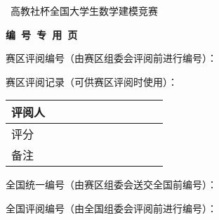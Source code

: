 \renewcommand{\baselinestretch}{1.3}\normalsize
\newpage
\thispagestyle{empty} %
{\fontsize{14pt}{\baselineskip}\selectfont \bfseries
\begin{center}{\Large\the\year}~高教社杯全国大学生数学建模竞赛\par\vspace{.5\baselineskip}\par
{\fontsize{15.75pt}{\baselineskip}\selectfont\bf 编\ 号\ 专\ 用\ 页}
\end{center}\par\vspace{1em}\par}
{%
\par\vfill
赛区评阅编号（由赛区组委会评阅前进行编号）：\par\vfill\vfill

赛区评阅记录（可供赛区评阅时使用）：\\
\begin{tabular}{|l|l|l|l|l|l|l|l|l|l|l|}
\hline
\multicolumn{1}{|c|}{\parbox[t]{0.5cm}{\vspace{1ex}评阅人\vspace{1ex}}\hfill}
&\multicolumn{1}{|c|}{\hspace{30pt}\hfill}
&\multicolumn{1}{|c|}{\hspace{30pt}\hfill}
&\multicolumn{1}{|c|}{\hspace{30pt}\hfill}
&\multicolumn{1}{|c|}{\hspace{30pt}\hfill}
&\multicolumn{1}{|c|}{\hspace{30pt}\hfill}
&\multicolumn{1}{|c|}{\hspace{30pt}\hfill}
&\multicolumn{1}{|c|}{\hspace{30pt}\hfill}
&\multicolumn{1}{|c|}{\hspace{30pt}\hfill}
&\multicolumn{1}{|c|}{\hspace{30pt}\hfill}
&\multicolumn{1}{|c|}{\hspace{30pt}\hfill}\\
\hline
\parbox[t]{0.5cm}{\vspace{1ex}评分\vspace{2ex}}& & & &
& & & & & &
\\\hline
\parbox[t]{0.5cm}{\vspace{1ex}备注\vspace{2ex}}& & & & & & & & & & \\\hline
\end{tabular}
\par\vfill\vfill

全国统一编号（由赛区组委会送交全国前编号）：\par\vfill\vfill\vfill


全国评阅编号（由全国组委会评阅前进行编号）：\par\vfill\vfill\vfill
}
\renewcommand{\baselinestretch}{1.3}\normalsize
{} 
